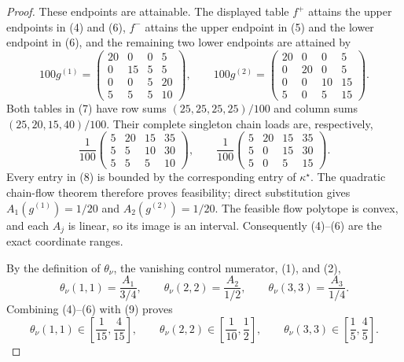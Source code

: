 \documentclass{article}
\begin{document}
\begin{proof}
These endpoints are attainable.  The displayed table \(f^+\) attains the upper endpoints in (4) and (6), \(f^-\) attains the upper endpoint in (5) and the lower endpoint in (6), and the remaining two lower endpoints are attained by
\[
100g^{(1)}=
\begin{pmatrix}
20&0&0&5\\
0&15&5&5\\
0&0&5&20\\
5&5&5&10
\end{pmatrix},
\qquad
100g^{(2)}=
\begin{pmatrix}
20&0&0&5\\
0&20&0&5\\
0&0&10&15\\
5&0&5&15
\end{pmatrix}. \tag{7}
\]
Both tables in (7) have row sums \((25,25,25,25)/100\) and column sums \((25,20,15,40)/100\).  Their complete singleton chain loads are, respectively,
\[
\frac1{100}
\begin{pmatrix}
5&20&15&35\\
5&5&10&30\\
5&5&5&10
\end{pmatrix},
\qquad
\frac1{100}
\begin{pmatrix}
5&20&15&35\\
5&0&15&30\\
5&0&5&15
\end{pmatrix}. \tag{8}
\]
Every entry in (8) is bounded by the corresponding entry of \(\kappa^\star\).  The quadratic chain-flow theorem therefore proves feasibility; direct substitution gives \(A_1(g^{(1)})=1/20\) and \(A_2(g^{(2)})=1/20\).  The feasible flow polytope is convex, and each \(A_j\) is linear, so its image is an interval.  Consequently (4)--(6) are the exact coordinate ranges.

By the definition of \(\theta_\nu\), the vanishing control numerator, (1), and (2),
\[
 \theta_\nu(1,1)=\frac{A_1}{3/4},\qquad
 \theta_\nu(2,2)=\frac{A_2}{1/2},\qquad
 \theta_\nu(3,3)=\frac{A_3}{1/4}. \tag{9}
\]
Combining (4)--(6) with (9) proves
\[
 \theta_\nu(1,1)\in\left[\frac1{15},\frac4{15}\right],\qquad
 \theta_\nu(2,2)\in\left[\frac1{10},\frac12\right],\qquad
 \theta_\nu(3,3)\in\left[\frac15,\frac45\right]. \tag{10}
\]


\end{proof}
\end{document}
